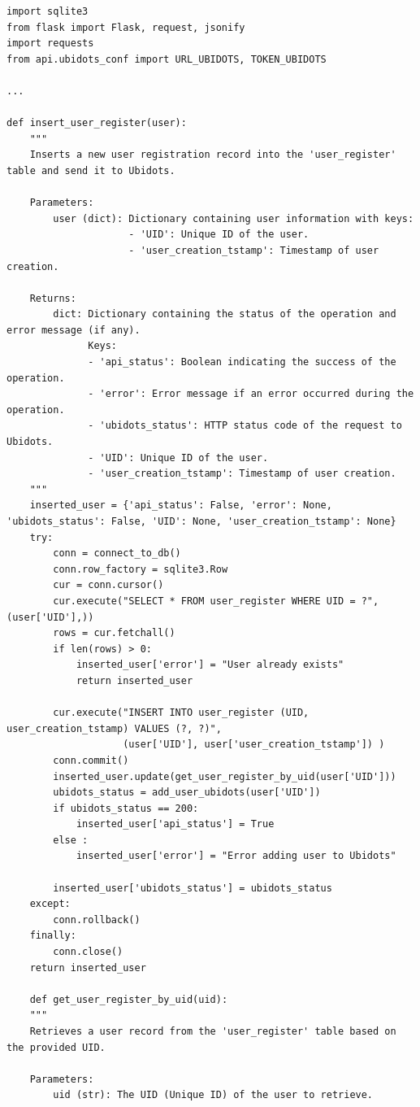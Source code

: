 \documentclass{article}
\begin{document}
\begin{lstlisting}
import sqlite3
from flask import Flask, request, jsonify
import requests
from api.ubidots_conf import URL_UBIDOTS, TOKEN_UBIDOTS

...

def insert_user_register(user):
    """
    Inserts a new user registration record into the 'user_register' table and send it to Ubidots.

    Parameters:
        user (dict): Dictionary containing user information with keys:
                     - 'UID': Unique ID of the user.
                     - 'user_creation_tstamp': Timestamp of user creation.

    Returns:
        dict: Dictionary containing the status of the operation and error message (if any).
              Keys:
              - 'api_status': Boolean indicating the success of the operation.
              - 'error': Error message if an error occurred during the operation.
              - 'ubidots_status': HTTP status code of the request to Ubidots.
              - 'UID': Unique ID of the user.
              - 'user_creation_tstamp': Timestamp of user creation.
    """
    inserted_user = {'api_status': False, 'error': None, 'ubidots_status': False, 'UID': None, 'user_creation_tstamp': None}
    try:
        conn = connect_to_db()
        conn.row_factory = sqlite3.Row
        cur = conn.cursor()
        cur.execute("SELECT * FROM user_register WHERE UID = ?", (user['UID'],))
        rows = cur.fetchall()
        if len(rows) > 0:
            inserted_user['error'] = "User already exists"
            return inserted_user
        
        cur.execute("INSERT INTO user_register (UID, user_creation_tstamp) VALUES (?, ?)",
                    (user['UID'], user['user_creation_tstamp']) )
        conn.commit()
        inserted_user.update(get_user_register_by_uid(user['UID']))
        ubidots_status = add_user_ubidots(user['UID'])
        if ubidots_status == 200:
            inserted_user['api_status'] = True
        else :
            inserted_user['error'] = "Error adding user to Ubidots"
            
        inserted_user['ubidots_status'] = ubidots_status
    except:
        conn.rollback()
    finally:
        conn.close()
    return inserted_user

	def get_user_register_by_uid(uid):
    """
    Retrieves a user record from the 'user_register' table based on the provided UID.

    Parameters:
        uid (str): The UID (Unique ID) of the user to retrieve.


\end{lstlisting}
\end{document}
